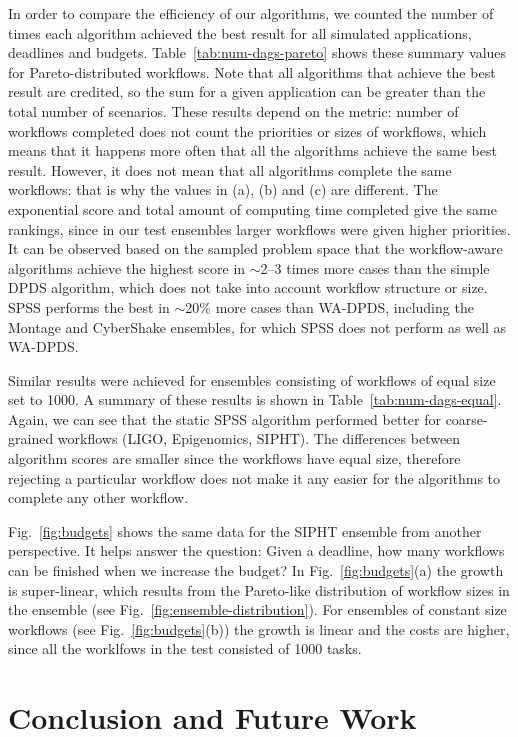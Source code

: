 \documentclass{sig-alternate}
\begin{document}
       
In order to compare the efficiency of our algorithms, we counted the number of times
each algorithm achieved the best result for all simulated applications, deadlines
and budgets. Table~\ref{tab:num-dags-pareto} shows these summary values for 
Pareto-distributed workflows. Note that all algorithms that achieve the best 
result are credited, so the sum for a given application can be greater than the
total number of scenarios. These results depend on the metric: number of
workflows completed does not count the priorities or sizes of workflows, which
means that it happens more often that all the algorithms achieve the same best
result. However, it does not mean that all algorithms complete the same
workflows: that is why the values in (a), (b) and (c) are different. The 
exponential score and total amount of computing time completed give the same
rankings, since in our test ensembles larger workflows were given higher
priorities. It can be observed based on the sampled problem space that the
workflow-aware algorithms achieve the highest score in $\sim$2--3 times more 
cases than the simple DPDS algorithm, which does not take into account workflow 
structure or size. SPSS performs the best in $\sim$20\% more cases than WA-DPDS,
including the Montage and CyberShake ensembles, for which SPSS does not 
perform as well as WA-DPDS.

Similar results were achieved for ensembles consisting of workflows of equal
size set to 1000. A summary of these results is shown in
Table~\ref{tab:num-dags-equal}. Again, we can see that the static SPSS algorithm performed better for coarse-grained
workflows (LIGO, Epigenomics, SIPHT). The differences between algorithm scores
are smaller since the workflows have equal size, therefore rejecting a particular
workflow does not make it any easier for the algorithms to complete any other 
workflow.

Fig.~\ref{fig:budgets} shows the same data for the SIPHT ensemble from another
perspective. It helps answer the question: Given a deadline, how many workflows
can be finished when we increase the budget? In Fig.~\ref{fig:budgets}(a) the
growth is super-linear, which results from the Pareto-like distribution of 
workflow sizes in the ensemble (see Fig.~\ref{fig:ensemble-distribution}). 
For ensembles of constant size workflows (see Fig.~\ref{fig:budgets}(b)) 
the growth is linear and the costs are higher, since all the worklfows in the
test consisted of 1000 tasks.



\section{Conclusion and Future Work}
\label{sec:conclusions}
\end{document}
